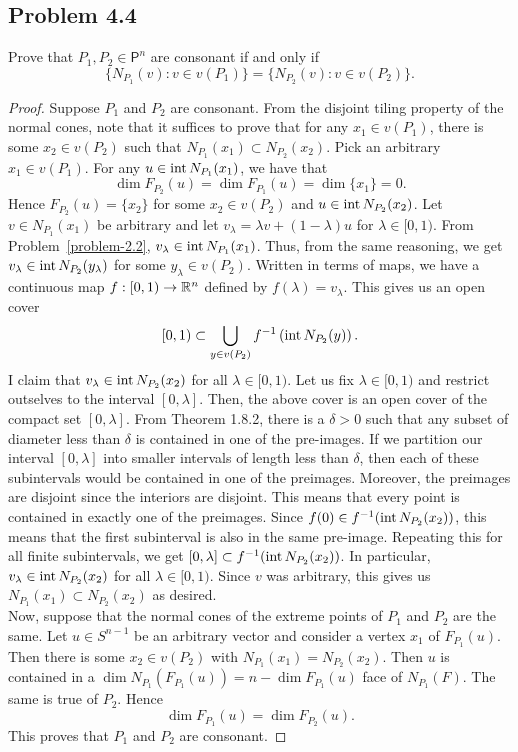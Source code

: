 \documentclass[12pt]{article}
\begin{document}
\newpage 

\subsection{Problem 4.4}

\begin{problem} \label{problem-4.4}
	Prove that $P_1, P_2 \in \mathsf{P}^n$ are consonant if and only if 
    \[
        \{N_{P_1}(v) : v \in v(P_1) \} = \{N_{P_2}(v) : v \in v(P_2) \}.   
    \]
\end{problem}

\begin{proof}
	Suppose $P_1$ and $P_2$ are consonant. From the disjoint tiling property of the normal cones, note that it suffices to prove that for any $x_1 \in v(P_1)$, there is some $x_2 \in v(P_2)$ such that $N_{P_1}(x_1) \subset N_{P_2}(x_2)$. Pick an arbitrary $x_1 \in v(P_1)$. For any $u \in \operatorname{int} N_{P_1}(x_1)$, we have that 
	\[
		\dim F_{P_2}(u) = \dim F_{P_1}(u) = \dim \{x_1\} = 0.
	\] 
	Hence $F_{P_2}(u) = \{x_2\}$ for some $x_2 \in v(P_2)$ and $u \in \operatorname{int} N_{P_2}(x_2)$. Let $v \in N_{P_1}(x_1)$ be arbitrary and let $v_\lambda = \lambda v + (1-\lambda) u$ for $\lambda \in [0, 1)$. From Problem~\ref{problem-2.2}, $v_\lambda \in \operatorname{int} N_{P_1}(x_1)$. Thus, from the same reasoning, we get $v_\lambda \in \operatorname{int} N_{P_2}(y_\lambda)$ for some $y_\lambda \in v(P_2)$. Written in terms of maps, we have a continuous map $f : [0, 1) \to \mathbb{R}^n$ defined by $f(\lambda) = v_\lambda$. This gives us an open cover
	\[
		[0, 1) \subset \bigcup_{y \in v(P_2)} f^{-1} \left ( \operatorname{int} N_{P_2}(y) \right ).
	\]
	I claim that $v_\lambda \in \operatorname{int} N_{P_2}(x_2)$ for all $\lambda \in [0, 1)$. Let us fix $\lambda \in [0, 1)$ and restrict outselves to the interval $[0, \lambda]$. Then, the above cover is an open cover of the compact set $[0, \lambda]$. From Theorem 1.8.2, there is a $\delta > 0$ such that any subset of diameter less than $\delta$ is contained in one of the pre-images. If we partition our interval $[0, \lambda]$ into smaller intervals of length less than $\delta$, then each of these subintervals would be contained in one of the preimages. Moreover, the preimages are disjoint since the interiors are disjoint. This means that every point is contained in exactly one of the preimages. Since $f(0) \in f^{-1}(\operatorname{int} N_{P_2}(x_2))$, this means that the first subinterval is also in the same pre-image. Repeating this for all finite subintervals, we get $[0, \lambda] \subset f^{-1}(\operatorname{int} N_{P_2}(x_2))$. In particular, $v_\lambda \in \operatorname{int} N_{P_2}(x_2)$ for all $\lambda \in [0, 1)$. Since $v$ was arbitrary, this gives us $N_{P_1}(x_1) \subset N_{P_2}(x_2)$ as desired. \\

	Now, suppose that the normal cones of the extreme points of $P_1$ and $P_2$ are the same. Let $u \in S^{n-1}$ be an arbitrary vector and consider a vertex $x_1$ of $F_{P_1}(u)$. Then there is some $x_2 \in v(P_2)$ with $N_{P_1}(x_1) = N_{P_2}(x_2)$. Then $u$ is contained in a $\dim N_{P_1}(F_{P_1}(u)) = n - \dim F_{P_1}(u)$ face of $N_{P_1}(F)$. The same is true of $P_2$. Hence 
	\[
		\dim F_{P_1}(u) = \dim F_{P_2}(u). 
	\]
	This proves that $P_1$ and $P_2$ are consonant.
\end{proof}
\end{document}

